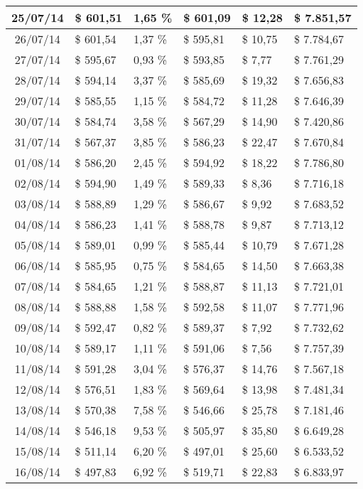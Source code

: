 \begin{small}
\begin{longtable}{|c|l|l|l|l|l|}
25/07/14 & \$ 601,51 & 1,65 \% & \$ 601,09 & \$ 12,28 & \$ 7.851,57 \\ \hline
26/07/14 & \$ 601,54 & 1,37 \% & \$ 595,81 & \$ 10,75 & \$ 7.784,67 \\ \hline
27/07/14 & \$ 595,67 & 0,93 \% & \$ 593,85 & \$ 7,77 & \$ 7.761,29 \\ \hline
28/07/14 & \$ 594,14 & 3,37 \% & \$ 585,69 & \$ 19,32 & \$ 7.656,83 \\ \hline
29/07/14 & \$ 585,55 & 1,15 \% & \$ 584,72 & \$ 11,28 & \$ 7.646,39 \\ \hline
30/07/14 & \$ 584,74 & 3,58 \% & \$ 567,29 & \$ 14,90 & \$ 7.420,86 \\ \hline
31/07/14 & \$ 567,37 & 3,85 \% & \$ 586,23 & \$ 22,47 & \$ 7.670,84 \\ \hline
01/08/14 & \$ 586,20 & 2,45 \% & \$ 594,92 & \$ 18,22 & \$ 7.786,80 \\ \hline
02/08/14 & \$ 594,90 & 1,49 \% & \$ 589,33 & \$ 8,36 & \$ 7.716,18 \\ \hline
03/08/14 & \$ 588,89 & 1,29 \% & \$ 586,67 & \$ 9,92 & \$ 7.683,52 \\ \hline
04/08/14 & \$ 586,23 & 1,41 \% & \$ 588,78 & \$ 9,87 & \$ 7.713,12 \\ \hline
05/08/14 & \$ 589,01 & 0,99 \% & \$ 585,44 & \$ 10,79 & \$ 7.671,28 \\ \hline
06/08/14 & \$ 585,95 & 0,75 \% & \$ 584,65 & \$ 14,50 & \$ 7.663,38 \\ \hline
07/08/14 & \$ 584,65 & 1,21 \% & \$ 588,87 & \$ 11,13 & \$ 7.721,01 \\ \hline
08/08/14 & \$ 588,88 & 1,58 \% & \$ 592,58 & \$ 11,07 & \$ 7.771,96 \\ \hline
09/08/14 & \$ 592,47 & 0,82 \% & \$ 589,37 & \$ 7,92 & \$ 7.732,62 \\ \hline
10/08/14 & \$ 589,17 & 1,11 \% & \$ 591,06 & \$ 7,56 & \$ 7.757,39 \\ \hline
11/08/14 & \$ 591,28 & 3,04 \% & \$ 576,37 & \$ 14,76 & \$ 7.567,18 \\ \hline
12/08/14 & \$ 576,51 & 1,83 \% & \$ 569,64 & \$ 13,98 & \$ 7.481,34 \\ \hline
13/08/14 & \$ 570,38 & 7,58 \% & \$ 546,66 & \$ 25,78 & \$ 7.181,46 \\ \hline
14/08/14 & \$ 546,18 & 9,53 \% & \$ 505,97 & \$ 35,80 & \$ 6.649,28 \\ \hline
15/08/14 & \$ 511,14 & 6,20 \% & \$ 497,01 & \$ 25,60 & \$ 6.533,52 \\ \hline
16/08/14 & \$ 497,83 & 6,92 \% & \$ 519,71 & \$ 22,83 & \$ 6.833,97 \\ \hline

\end{longtable}
\end{small}
